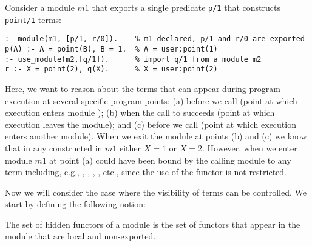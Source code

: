 \documentclass{llncs}
\newcommand{\finalcompression}[1]{\vspace*{#1}}
\begin{document}
\begin{myexample}
\label{ex:nohidden}
Consider a module $m1$ that exports a single predicate \texttt{p/1} that
constructs \texttt{point/1} terms:
%
\finalcompression{-1mm}
\begin{small}
\begin{verbatim}
:- module(m1, [p/1, r/0]).    % m1 declared, p/1 and r/0 are exported
p(A) :- A = point(B), B = 1.  % A = user:point(1)
:- use_module(m2,[q/1]).      % import q/1 from a module m2
r :- X = point(2), q(X).      % X = user:point(2)
\end{verbatim}
\end{small}
\finalcompression{-1mm}
%
Here, we want to reason about the terms that can appear during
program execution at several specific program points:
%
(a) before we call 
(point at which execution enters module );
%
(b) when the call to  succeeds
(point at which execution leaves the module);
%
and (c) before we call 
(point at which execution enters another module).
%
When we exit the module at points (b) and (c)
we know that in any  constructed in $m1$ either $X = 1$
or $X = 2$.
%
However, when we enter module $m1$ at point (a)
 could have been bound by the calling module to any term
including, e.g.,
, , , , etc.,
%
since the use of the  functor is not restricted.
\end{myexample}


Now we will consider the case where the visibility of terms can be
controlled. We start by defining the following notion:

\begin{definition}
%
The set of hidden functors of a module is the set of functors that appear
in the module that are local and non-exported.
%

\end{definition}
\end{document}
